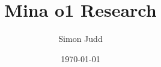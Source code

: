 \documentclass{article}
\title{Mina o1 Research}
\author{Simon Judd}
\date{\today}
\theoremstyle{plain} %
\theoremstyle{definition} %
\theoremstyle{remark} %
\begin{document}
\maketitle

\begin{abstract}

\end{abstract}
\end{document}
